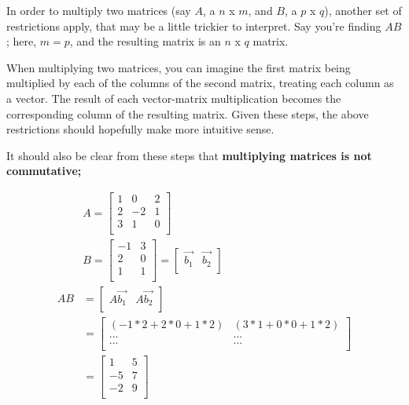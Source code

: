 \documentclass[12pt]{article}
\begin{document}
\begin{itemize}
    In order to multiply two matrices (say $A$, a $n$ x $m$, and $B$, a $p$ x $q$), another set of restrictions apply, that may be a little trickier to interpret. Say you're finding $AB$; here, $m = p$, and the resulting matrix is an $n$ x $q$ matrix. 
    
    When multiplying two matrices, you can imagine the first matrix being multiplied by each of the columns of the second matrix, treating each column as a vector. The result of each vector-matrix multiplication becomes the corresponding column of the resulting matrix. Given these steps, the above restrictions should hopefully make more intuitive sense.
    
    It should also be clear from these steps that \textbf{multiplying matrices is not commutative;}
    
    \begin{equation}
        \begin{split}
            &A = \begin{bmatrix}
            1 & 0 & 2 \\
            2 & -2 & 1 \\
            3 & 1 & 0 \\
            \end{bmatrix}\\
            &B = \begin{bmatrix}
            -1 & 3\\
            2 & 0\\
            1 & 1\\
            \end{bmatrix} = \begin{bmatrix}
            \Vec{b_1} & \vec{b_2}\\
            \end{bmatrix}\\
            AB &= \begin{bmatrix}
            A\Vec{b_1} & A\Vec{b_2}\\
            \end{bmatrix}\\
            &= \begin{bmatrix}
                (-1*2+2*0+1*2) & (3*1 + 0*0 + 1*2) \\
                ... & ...\\
                ... & ...\\
            \end{bmatrix}\\
            &= \begin{bmatrix}
                1 & 5\\
                -5 & 7\\
                -2 & 9\\
            \end{bmatrix}
        \end{split}
    \end{equation}
    

\end{itemize}
\end{document}
